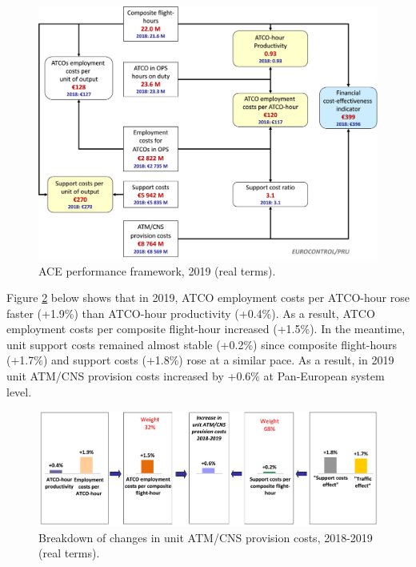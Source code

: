 \documentclass[
]{book}
\begin{document}
\begin{figure}

{\centering \includegraphics[width=1\linewidth]{figures/Figure 4-2} 

}

\caption{ACE performance framework, 2019 (real terms).}\label{fig:figure12}
\end{figure}

Figure \ref{fig:figure13} below shows that in 2019, ATCO employment costs per ATCO-hour rose faster (+1.9\%) than ATCO-hour productivity (+0.4\%). As a result, ATCO employment costs per composite flight-hour increased (+1.5\%). In the meantime, unit support costs remained almost stable (+0.2\%) since composite flight-hours (+1.7\%) and support costs (+1.8\%) rose at a similar pace. As a result, in 2019 unit ATM/CNS provision costs increased by +0.6\% at Pan-European system level.



\begin{figure}

{\centering \includegraphics[width=1\linewidth]{figures/Figure 4-3} 

}

\caption{Breakdown of changes in unit ATM/CNS provision costs, 2018-2019 (real terms).}\label{fig:figure13}
\end{figure}
\end{document}
